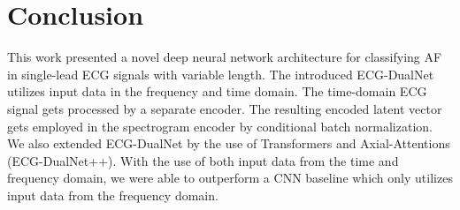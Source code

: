 \section{Conclusion} \label{sec:conclusion}

This work presented a novel deep neural network architecture for classifying AF in single-lead ECG signals with variable length. The introduced ECG-DualNet utilizes input data in the frequency and time domain. The time-domain ECG signal gets processed by a separate encoder. The resulting encoded latent vector gets employed in the spectrogram encoder by conditional batch normalization. We also extended ECG-DualNet by the use of Transformers and Axial-Attentions (ECG-DualNet++). With the use of both input data from the time and frequency domain, we were able to outperform a CNN baseline which only utilizes input data from the frequency domain.